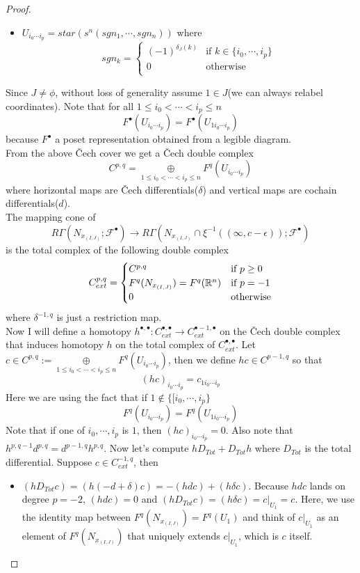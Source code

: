 \begin{proof}
\begin{itemize}
\item $U_{i_0\cdots i_p} = star(s^n(sgn_1,\cdots, sgn_n))$ where
\[
sgn_k=
\begin{cases}
    (-1)^{\delta_J(k)} & \text{if } k\in \{i_0,\cdots,i_p\}\\
    0 & \text{otherwise}\\
\end{cases}
\]
\end{itemize}
Since $J\neq \phi$, without loss of generality assume $1\in J$(we can always relabel coordinates). Note that for all $1\leq i_0 <\cdots<i_p\leq n$
\[
F^\bullet(U_{i_0\cdots i_p}) = F^\bullet(U_{1i_0\cdots i_p})
\]
because $F^\bullet$ a poset representation obtained from a legible diagram.\\
From the above \v{C}ech cover we get a \v{C}ech double complex
\[
C^{p,q} = \underset{1\leq i_0<\cdots < i_p \leq n}{\oplus} F^q(U_{i_0\cdots i_p})
\]
where horizontal maps are \v{C}ech differentials($\delta$) and vertical maps are cochain differentials($d$).\\
The mapping cone of 
\[R\Gamma(N_{x_{(I,J)}};\mathscr{F}^\bullet) \rightarrow R\Gamma(N_{x_{(I,J)}} \cap \xi^{-1}((\infty,c-\epsilon));\mathscr{F}^\bullet)
\]
is the total complex of the following double complex
\[
C_{ext}^{p,q}=
\begin{cases}
    C^{p,q} & \text{if } p\geq 0\\
    F^q(N_{x_{(I,J)}}) = F^q(\mathbb{R}^n) & \text{if } p=-1\\
    0 & \text{otherwise}\\
\end{cases}
\]
where $\delta^{-1,q}$ is just a restriction map.\\
Now I will define a homotopy $h^{\bullet,\bullet} : C_{ext}^{\bullet,\bullet} \rightarrow C_{ext}^{\bullet -1,\bullet}$ on the \v{C}ech double complex that induces homotopy $h$ on the total complex of $C_{ext}^{\bullet,\bullet}$.
Let $c\in C^{p,q}:= \underset{1\leq i_0 < \cdots< i_p \leq n}{\oplus} F^q(U_{i_0\cdots i_p})$, then we define $hc \in C^{p-1,q}$ so that 
\[
(hc)_{i_0\cdots i_p} = c_{1i_0\cdots i_p}
\]
Here we are using the fact that if $1 \not\in \{[i_0,\cdots,i_p\}$ 
\[
F^q(U_{i_0\cdots i_p}) = F^q(U_{1i_0\cdots i_p})
\]
Note that if one of $i_0,\cdots, i_p$ is $1$, then $(hc)_{i_0\cdots i_p}=0$. Also note that $h^{p,q-1} d^{p,q} = d^{p-1,q} h^{p,q}$.
Now let's compute $h D_{Tot} + D_{Tot}h$ where $D_{Tot}$ is the total differential. Suppose $c\in C_{ext}^{-1,q}$, then
\begin{itemize}
\item $(hD_{Tot}c) = (h(-d+\delta)c) = -(hdc) + (h\delta c)$. Because $hdc$ lands on degree $p=-2$, $(hdc)=0$ and $(hD_{Tot}c)=(h\delta c) = c|_{U_1}=c$. Here, we use the identity map between $F^q(N_{x_{(I,J)}}) = F^q(U_1)$ and think of $c|_{U_1}$ as an element of $F^q(N_{x_{(I,J)}})$ that uniquely extends $c|_{U_1}$, which is $c$ itself.


\end{itemize}
\end{proof}
